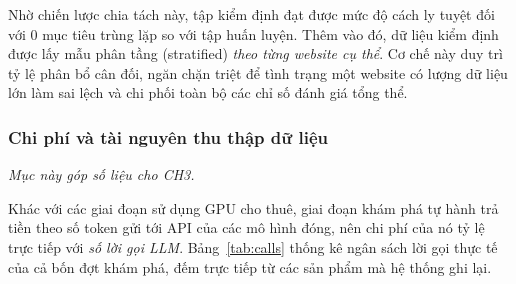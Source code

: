 Nhờ chiến lược chia tách này, tập kiểm định đạt được mức độ cách ly tuyệt đối với 0 mục tiêu trùng lặp so với tập huấn luyện. Thêm vào đó, dữ liệu kiểm định được lấy mẫu phân tầng (stratified) \emph{theo từng website cụ thể}. Cơ chế này duy trì tỷ lệ phân bổ cân đối, ngăn chặn triệt để tình trạng một website có lượng dữ liệu lớn làm sai lệch và chi phối toàn bộ các chỉ số đánh giá tổng thể.

\subsubsection{Chi phí và tài nguyên thu thập dữ liệu}
\label{sec:exp-cost-explore}

\noindent\emph{Mục này góp số liệu cho CH3.}

Khác với các giai đoạn sử dụng GPU cho thuê, giai đoạn khám phá tự hành trả tiền theo số token gửi tới API của các mô hình đóng, nên chi phí của nó tỷ lệ trực tiếp với \emph{số lời gọi LLM}. Bảng~\ref{tab:calls} thống kê ngân sách lời gọi thực tế của cả bốn đợt khám phá, đếm trực tiếp từ các sản phẩm mà hệ thống ghi lại.

